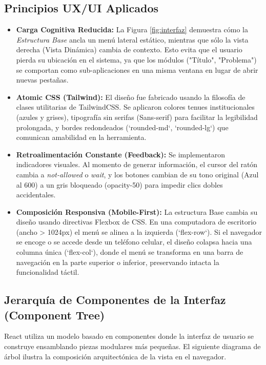 \subsection{Principios UX/UI Aplicados}
\begin{itemize}
    \item \textbf{Carga Cognitiva Reducida:} La Figura \ref{fig:interfaz} demuestra cómo la \textit{Estructura Base} ancla un menú lateral estático, mientras que sólo la vista derecha (Vista Dinámica) cambia de contexto. Esto evita que el usuario pierda su ubicación en el sistema, ya que los módulos ("Título", "Problema") se comportan como sub-aplicaciones en una misma ventana en lugar de abrir nuevas pestañas.
    \item \textbf{Atomic CSS (Tailwind):} El diseño fue fabricado usando la filosofía de clases utilitarias de TailwindCSS. Se aplicaron colores tenues institucionales (azules y grises), tipografía sin serifas (Sans-serif) para facilitar la legibilidad prolongada, y bordes redondeados (`rounded-md`, `rounded-lg`) que comunican amabilidad en la herramienta.
    \item \textbf{Retroalimentación Constante (Feedback):} Se implementaron indicadores visuales. Al momento de generar información, el cursor del ratón cambia a \textit{not-allowed} o \textit{wait}, y los botones cambian de su tono original (Azul al 600) a un gris bloqueado (opacity-50) para impedir clics dobles accidentales.
    \item \textbf{Composición Responsiva (Mobile-First):} La estructura Base cambia su diseño usando directivas Flexbox de CSS. En una computadora de escritorio (ancho > 1024px) el menú se alinea a la izquierda (`flex-row`). Si el navegador se encoge o se accede desde un teléfono celular, el diseño colapsa hacia una columna única (`flex-col`), donde el menú se transforma en una barra de navegación en la parte superior o inferior, preservando intacta la funcionalidad táctil.
\end{itemize}

\subsection{Jerarquía de Componentes de la Interfaz (Component Tree)}

React utiliza un modelo basado en componentes donde la interfaz de usuario se construye ensamblando piezas modulares más pequeñas. El siguiente diagrama de árbol ilustra la composición arquitectónica de la vista en el navegador.

